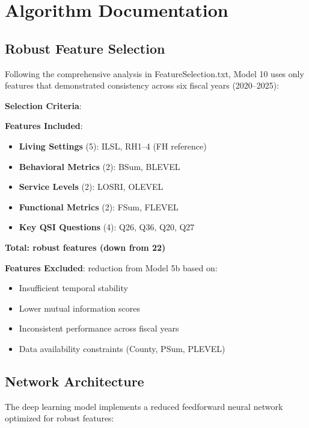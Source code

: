 \section{Algorithm Documentation}

\subsection{Robust Feature Selection}

Following the comprehensive analysis in FeatureSelection.txt, Model 10 uses only \ModelTenRobustFeatures{} features that demonstrated consistency across six fiscal years (2020--2025):

\textbf{Selection Criteria}: \ModelTenSelectionCriteria{}

\textbf{Features Included}:
\begin{itemize}
    \item \textbf{Living Settings} (5): ILSL, RH1--4 (FH reference)
    \item \textbf{Behavioral Metrics} (2): BSum, BLEVEL
    \item \textbf{Service Levels} (2): LOSRI, OLEVEL
    \item \textbf{Functional Metrics} (2): FSum, FLEVEL
    \item \textbf{Key QSI Questions} (4): Q26, Q36, Q20, Q27
\end{itemize}

\textbf{Total: \ModelTenRobustFeatures{} robust features (down from 22)}

\textbf{Features Excluded}: \ModelTenFeatureReduction{} reduction from Model 5b based on:
\begin{itemize}
    \item Insufficient temporal stability
    \item Lower mutual information scores
    \item Inconsistent performance across fiscal years
    \item Data availability constraints (County, PSum, PLEVEL)
\end{itemize}

\subsection{Network Architecture}

The deep learning model implements a reduced feedforward neural network optimized for \ModelTenRobustFeatures{} robust features:

